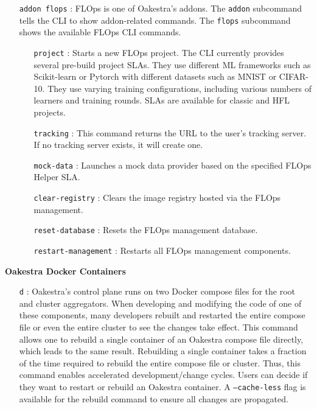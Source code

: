 \begin{itemize}
    \item [\texttt{addon flops}]:
        FLOps is one of Oakestra's addons.
        The \texttt{addon} subcommand tells the CLI to show addon-related commands.
        The \texttt{flops} subcommand shows the available FLOps CLI commands.
        \begin{itemize}
            \item [\texttt{project}]:
                Starts a new FLOps project.
                The CLI currently provides several pre-build project SLAs.
                They use different ML frameworks such as Scikit-learn or Pytorch with different datasets such as MNIST or CIFAR-10.
                They use varying training configurations, including various numbers of learners and training rounds.
                SLAs are available for classic and HFL projects.
            \item [\texttt{tracking}]:
                This command returns the URL to the user's tracking server.
                If no tracking server exists, it will create one.
            \item [\texttt{mock-data}]:
                Launches a mock data provider based on the specified FLOps Helper SLA.
            \item [\texttt{clear-registry}]:
                Clears the image registry hosted via the FLOps management.
            \item [\texttt{reset-database}]:
                Resets the FLOps management database.
            \item [\texttt{restart-management}]:
                Restarts all FLOps management components.
        \end{itemize}
\end{itemize}
\vspace{5mm}
\textbf{Oakestra Docker Containers}
\begin{itemize}
    \item [\texttt{d}]:
        Oakestra's control plane runs on two Docker compose files for the root and cluster aggregators.
        When developing and modifying the code of one of these components, many developers rebuilt and restarted the entire compose file or even the entire cluster to see the changes take effect.
        This command allows one to rebuild a single container of an Oakestra compose file directly, which leads to the same result.
        Rebuilding a single container takes a fraction of the time required to rebuild the entire compose file or cluster.
        Thus, this command enables accelerated development/change cycles.
        Users can decide if they want to restart or rebuild an Oakestra container.
        A \texttt{--cache-less} flag is available for the rebuild command to ensure all changes are propagated.
\end{itemize}
